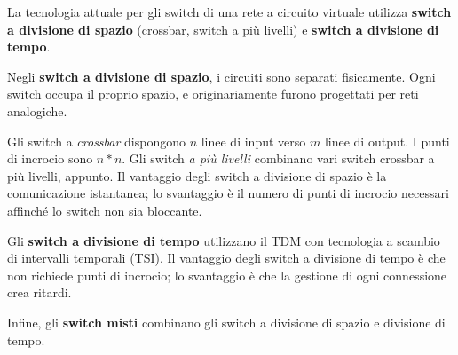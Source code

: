         La tecnologia attuale per gli switch di una rete a circuito virtuale utilizza \textbf{switch a divisione di spazio} (crossbar, switch a più livelli) e \textbf{switch a divisione di tempo}.
        
        \vspace{3mm}
        
        Negli \textbf{switch a divisione di spazio}, i circuiti sono separati fisicamente. Ogni switch occupa il proprio spazio, e originariamente furono progettati per reti analogiche. 
        
        Gli switch a \textit{crossbar} dispongono $n$ linee di input verso $m$ linee di output. I punti di incrocio sono $n*n$. Gli switch \textit{a più livelli} combinano vari switch crossbar a più livelli, appunto. Il vantaggio degli switch a divisione di spazio è la comunicazione istantanea; lo svantaggio è il numero di punti di incrocio necessari affinché lo switch non sia bloccante.
        
        \vspace{3mm}
        
        Gli \textbf{switch a divisione di tempo} utilizzano il TDM con tecnologia a scambio di intervalli temporali (TSI). Il vantaggio degli switch a divisione di tempo è che non richiede punti di incrocio; lo svantaggio è che la gestione di ogni connessione crea ritardi.
        
        \vspace{3mm}
        
        Infine, gli \textbf{switch misti} combinano gli switch a divisione di spazio e divisione di tempo.